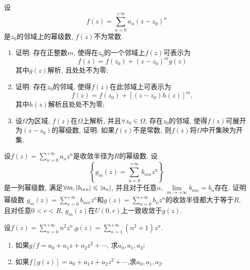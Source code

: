 \begin{yyEx}
    设\begin{equation*}
        f(z) = \sum_{n = 0}^{+\infty}a_n(z-z_0)^n
    \end{equation*}是$z_0$的邻域上的幂级数, $f(z)$不为常数.
    \begin{enumerate}
        \item 证明: 存在正整数$m$, 使得在$z_0$的一个邻域上$f(z)$可表示为
        \begin{equation*}
            f(z) = f(z_0) +(z-z_0)^mg(z)
        \end{equation*}
        其中$g(z)$解析, 且处处不为零;
        \item 证明: 存在$z_0$的邻域, 使得$f(z)$在此邻域上可表示为\begin{equation*}
            f(z) = f(z_0) + [(z-z_0)h(z)]^m,
        \end{equation*}
        其中$h(z)$解析且处处不为零;
        \item 设$\Omega$为区域, $f(z)$在$\Omega$上解析, 并且$\forall z_0\in\Omega$, 存在$z_0$的邻域, 使得$f(z)$可展开为$(z-z_0)$的幂级数, 证明: 如果$f(z)$不是常数, 则$f(z)$将$\Omega$中开集映为开集.
    \end{enumerate}
\end{yyEx}

\begin{yyEx}
    设$f(z) = \sum_{n=0}^{+\infty}a_nz^n$是收敛半径为$R$的幂级数. 设\begin{equation*}
        \left\{ g_m(z) = \sum_{n=0}^{+\infty}b_{mn}z^n \right\}
    \end{equation*}
    是一列幂级数, 满足$\forall m,\lvert b_{mn}\rvert\leqslant \lvert a_n\rvert$, 并且对于任意$n$, $\lim\limits_{m\to+\infty}b_{mn} = b_n$存在. 证明幂级数
    $g_m(z) = \sum_{n=0}^{+\infty}b_{mn}z^n$和$g(z) = \sum_{n=0}^{+\infty}b_nz^n$的收敛半径都大于等于$R$, 且对任意$0<r<R$, $g_m(z)$在$U(0,r)$上一致收敛于$g(z)$.
\end{yyEx}

\begin{yyEx}
    设$f(z) = \sum_{n = 0}^{+\infty}n^2z^n$,$g(z) = \sum_{n=1}^{+\infty}(n^2+1)z^n$.
    \begin{enumerate}
        \item 如果$g/f = a_0+a_1z+a_2z^2+\cdots$, 求$a_0,a_1,a_2$;
        \item 如果$f[g(z)] = a_0+a_1z+a_2z^2+\cdots$,求$a_0,a_1,a_2$.
    \end{enumerate}
\end{yyEx}

